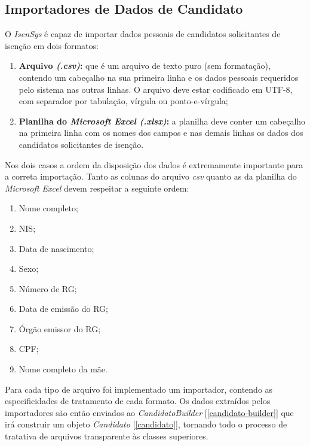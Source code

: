 \documentclass[
	12pt,			%
	openright,		%
	oneside,	
	a4paper,		%
	english,		%
	brazil			%
]{abntex2/abntex2}  %
\begin{document}
			\subsection{Importadores de Dados de Candidato}
	
				O \textit{IsenSys} é capaz de importar dados pessoais de candidatos solicitantes de isenção em dois formatos:
	
				\begin{enumerate}
					
					\item \textbf{Arquivo \textit{(.csv)}:} que é um arquivo de texto puro (sem formatação), contendo um cabeçalho na sua primeira linha e os dados pessoais requeridos pelo sistema nas outras linhas. O arquivo deve estar codificado em UTF-8, com separador por tabulação, vírgula ou ponto-e-vírgula;
					
					\item \textbf{Planilha do \textit{Microsoft Excel (.xlsx)}:} a planilha deve conter um cabeçalho na primeira linha com os nomes dos campos e nas demais linhas os dados dos candidatos solicitantes de isenção.
					
				\end{enumerate}

				Nos dois casos a ordem da disposição dos dados é extremamente importante para a correta importação. Tanto as colunas do arquivo \textit{csv} quanto as da planilha do \textit{Microsoft Excel} devem respeitar a seguinte ordem:
	
				\begin{enumerate}
					
					\item Nome completo;
					\item NIS;
					\item Data de nascimento;
					\item Sexo;
					\item Número de RG;
					\item Data de emissão do RG;
					\item Órgão emissor do RG;
					\item CPF;
					\item Nome completo da mãe.
					
				\end{enumerate}
	
				Para cada tipo de arquivo foi implementado um importador, contendo as especificidades de tratamento de cada formato. Os dados extraídos pelos importadores são então enviados ao \textit{CandidatoBuilder} [\ref{candidato-builder}] que irá construir um objeto \textit{Candidato} [\ref{candidato}], tornando todo o processo de tratativa de arquivos transparente às classes superiores.
	
\end{document}
